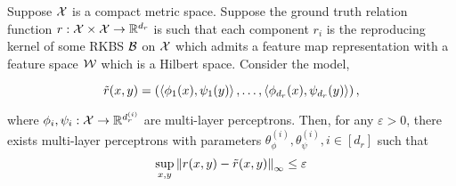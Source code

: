 \begin{theorem}\label{thm:mhr_approximates_rkbs}
   Suppose ${\mathcal{X}}$ is a compact metric space. Suppose the ground truth relation function $r: {\mathcal{X}} \times {\mathcal{X}} \to \mathbb{R}^{d_r}$ is such that each component $r_i$ is the reproducing kernel of some RKBS ${\mathcal{B}}$ on ${\mathcal{X}}$ which admits a feature map representation with a feature space ${\mathcal{W}}$ which is a Hilbert space. Consider the model,

   \begin{equation}
    \tilde{r}(x, y) = \left(\left \langle \phi_1(x), \psi_1(y) \right\rangle, \ldots, \left \langle \phi_{d_r}(x), \psi_{d_r}(y) \right\rangle\right),
   \end{equation}

   \noindent where $\phi_i, \psi_i: {\mathcal{X}} \to \mathbb{R}^{d_r^{(i)}}$ are multi-layer perceptrons. Then, for any $\varepsilon > 0$, there exists multi-layer perceptrons with parameters $\theta_\phi^{(i)}, \theta_{\psi}^{(i)}, i \in [d_r]$ such that
   \begin{equation*}
        \sup_{x,y} \left\lVert r(x, y) - \tilde{r}(x, y)\right\rVert_{\infty} \leq \varepsilon
   \end{equation*}
\end{theorem}

